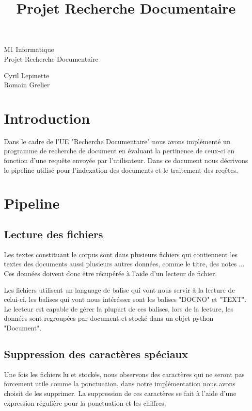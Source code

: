 \documentclass[11pt]{article}
\begin{document}
\title{Projet Recherche Documentaire}

\begin{center}

\Huge M1 Informatique \\
\vspace{3cm}
Projet Recherche Documentaire
\end{center}
\vspace{15cm}
Cyril Lepinette \\
Romain Grelier

\pagebreak

\section{Introduction}
Dans le cadre de l'UE "Recherche Documentaire" nous avons implémenté un programme de recherche de document en évaluant la pertinence de ceux-ci en fonction d'une requête envoyée par l'utilisateur.
Dans ce document nous décrivons le pipeline utilisé pour l'indexation des documents et le traitement des reqêtes.

\section{Pipeline}

\subsection{Lecture des fichiers}
Les textes constituant le corpus sont dans plusieurs fichiers qui contiennent les textes des documents aussi plusieurs autres données, comme le titre, des notes ...
Ces données doivent donc être récupérée à l'aide d'un lecteur de fichier.

Les fichiers utilisent un language de balise qui vont nous servir à la lecture de celui-ci, les balises qui vont nous intérésser sont les balises "DOCNO" et "TEXT".
Le lecteur est capable de gérer la plupart de ces balises, lors de la lecture, les données sont regroupées par document et stocké dans un objet python "Document".

\subsection{Suppression des caractères spéciaux}
Une fois les fichiers lu et stockés, nous observons des caractères qui ne seront pas forcement utile comme la ponctuation, dans notre implémentation nous avons choisit de les supprimer.
La suppression de ces caractères se fait à l'aide d'une expression régulière pour la ponctuation et les chiffres.
\end{document}
